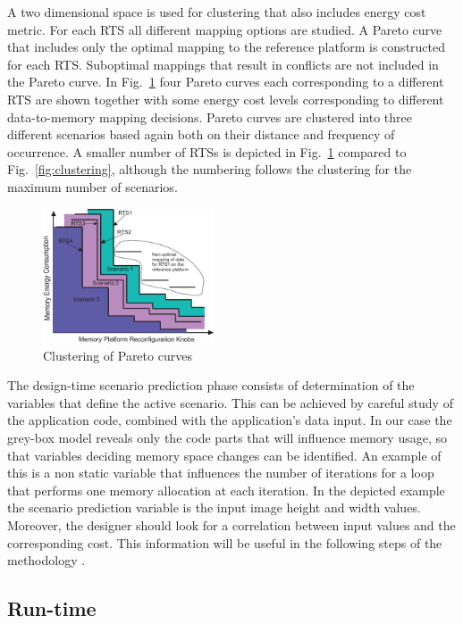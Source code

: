 \documentclass[a4paper,conference]{IEEEtran}
\begin{document}
A two dimensional space is used for clustering that also includes energy cost metric. For each RTS all different mapping options are studied. A Pareto curve that includes only the optimal mapping to the reference platform is constructed for each RTS. Suboptimal mappings that result in conflicts are not included in the Pareto curve. In Fig.~\ref{fig:pareto} four Pareto curves each corresponding to a different RTS are shown together with some energy cost levels corresponding to different data-to-memory mapping decisions. Pareto curves are clustered into three different scenarios based again both on their distance and frequency of occurrence. A smaller number of RTSs is depicted in Fig.~\ref{fig:pareto} compared to Fig.~\ref{fig:clustering}, although the numbering follows the clustering for the maximum number of scenarios. 

\begin{figure}[!t]
\centering
\includegraphics[width=0.45\textwidth]{Images/2DClustering.eps}
\caption{Clustering of Pareto curves}
\label{fig:pareto}
\end{figure}

The design-time scenario prediction phase consists of determination of the variables that define the active scenario. This can be achieved by careful study of the application code, combined with the application's data input. In our case the grey-box model reveals only the code parts that will influence memory usage, so that variables deciding memory space changes can be identified. An example of this is a non static variable that influences the number of iterations for a loop that performs one memory allocation at each iteration. In the depicted example the scenario prediction variable is the input image height and width values. Moreover, the designer should look for a correlation between input values and the corresponding cost. This information will be useful in the following steps of the methodology \cite{tcm}.

\subsection{Run-time}
\end{document}
